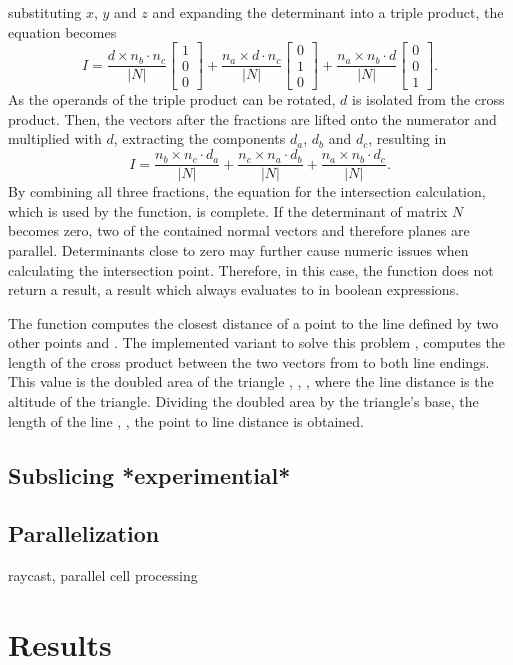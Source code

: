 substituting $x$, $y$ and $z$ and expanding the determinant into a triple product, the equation becomes
\begin{equation*}
	I =
	\frac{d \times n_b \cdot n_c}{|N|} \begin{bmatrix} 1 \\ 0 \\ 0 \end{bmatrix} +
	\frac{n_a \times d \cdot n_c}{|N|} \begin{bmatrix} 0 \\ 1 \\ 0 \end{bmatrix} +
	\frac{n_a \times n_b \cdot d}{|N|} \begin{bmatrix} 0 \\ 0 \\ 1 \end{bmatrix} \text{.}
\end{equation*}
As the operands of the triple product can be rotated, $d$ is isolated from the cross product.
Then, the vectors after the fractions are lifted onto the numerator and multiplied with $d$, extracting the components $d_a$, $d_b$ and $d_c$, resulting in
\begin{equation*}
I =
	\frac{n_b \times n_c \cdot d_a}{|N|} +
	\frac{n_c \times n_a \cdot d_b}{|N|} +
	\frac{n_a \times n_b \cdot d_c}{|N|} \text{.}
\end{equation*}
By combining all three fractions, the equation for the intersection calculation, which is used by the  function, is complete.
If the determinant of matrix $N$ becomes zero, two of the contained normal vectors and therefore planes are parallel.
Determinants close to zero may further cause numeric issues when calculating the intersection point.
Therefore, in this case, the function does not return a result, \ie a result which always evaluates to \False in boolean expressions.

The function  computes the closest distance of a point  to the line defined by two other points  and .
The implemented variant to solve this problem \cite{point_line_distance}, computes the length of the cross product between the two vectors from  to both line endings.
This value is the doubled area of the triangle , , , where the line distance is the altitude of the triangle.
Dividing the doubled area by the triangle's base, \ie the length of the line , , the point to line distance is obtained.


\subsection{Subslicing *experimential*}
\label{sec:tri_dexel_subslicing}



\subsection{Parallelization}
\label{sec:tri_dexel_parallelization}

raycast, parallel cell processing


\section{Results}
\label{sec:tri_dexel_results}


